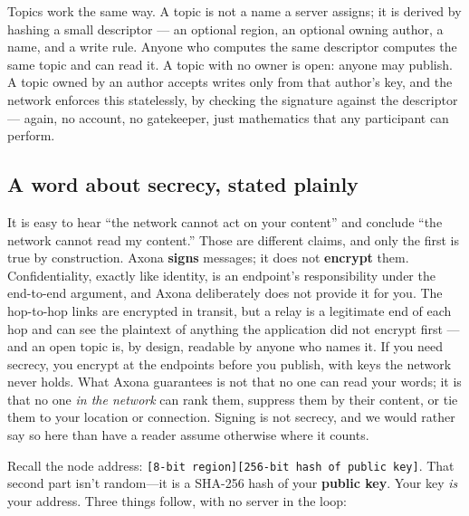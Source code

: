 \documentclass[nobib,justified]{tufte-handout}
\begin{document}
Topics work the same way. A topic is not a name a server assigns; it is derived
by hashing a small descriptor --- an optional region, an optional owning author,
a name, and a write rule. Anyone who computes the same descriptor computes the
same topic and can read it. A topic with no owner is open: anyone may publish. A
topic owned by an author accepts writes only from that author's key, and the
network enforces this statelessly, by checking the signature against the
descriptor --- again, no account, no gatekeeper, just mathematics that any
participant can perform.

\subsection{A word about secrecy, stated plainly}

It is easy to hear ``the network cannot act on your content'' and conclude ``the
network cannot read my content.'' Those are different claims, and only the first
is true by construction. Axona \textbf{signs} messages; it does not
\textbf{encrypt} them. Confidentiality, exactly like identity, is an endpoint's
responsibility under the end-to-end argument, and Axona deliberately does not
provide it for you. The hop-to-hop links are encrypted in transit, but a relay
is a legitimate end of each hop and can see the plaintext of anything the
application did not encrypt first --- and an open topic is, by design, readable
by anyone who names it. If you need secrecy, you encrypt at the endpoints before
you publish, with keys the network never holds. What
Axona guarantees is not that no one can read your words; it is that no one
\emph{in the network} can rank them, suppress them by their content, or tie them
to your location or connection. Signing is not secrecy, and we would rather say
so here than have a reader assume otherwise where it counts.



Recall the node address: \texttt{[8-bit region][256-bit hash of public key]}. That second part isn't random---it is a SHA-256 hash of your \textbf{public key}. Your key \emph{is} your address. Three things follow, with no server in the loop:
\end{document}
